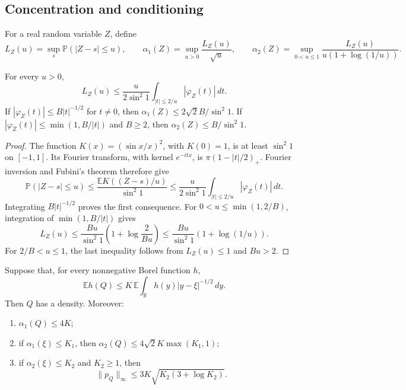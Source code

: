 \subsection{Concentration and conditioning}
For a real random variable $Z$, define
\[
 L_Z(u)=\sup_s\mathbb P(|Z-s|\leq u),\qquad
 \alpha_1(Z)=\sup_{u>0}\frac{L_Z(u)}{\sqrt u},\qquad
 \alpha_2(Z)=\sup_{0<u\leq1}
       \frac{L_Z(u)}{u(1+\log(1/u))}.
\]

\begin{lemma}\label{sd:fejer}
For every $u>0$,
\begin{equation}\label{sd:fejer-bound}
 L_Z(u)\leq\frac{u}{2\sin^2 1}
              \int_{|t|\leq2/u}|\varphi_Z(t)|\,dt.
\end{equation}
If $|\varphi_Z(t)|\leq B|t|^{-1/2}$ for $t\ne0$, then
$\alpha_1(Z)\leq2\sqrt2 B/\sin^2 1$.
If $|\varphi_Z(t)|\leq\min(1,B/|t|)$ and $B\geq2$, then
$\alpha_2(Z)\leq B/\sin^2 1$.
\end{lemma}

\begin{proof}
The function $K(x)=(\sin x/x)^2$, with $K(0)=1$, is at least
$\sin^2 1$ on $[-1,1]$.  Its Fourier transform, with kernel $e^{-itx}$,
is $\pi(1-|t|/2)_+$.  Fourier inversion and Fubini's theorem therefore give
\[
 \mathbb P(|Z-s|\leq u)
 \leq\frac{\mathbb E K((Z-s)/u)}{\sin^2 1}
 \leq\frac{u}{2\sin^2 1}
            \int_{|t|\leq2/u}|\varphi_Z(t)|\,dt.
\]
Integrating $B|t|^{-1/2}$ proves the first consequence.
For $0<u\leq\min(1,2/B)$, integration of $\min(1,B/|t|)$ gives
\[
 L_Z(u)\leq\frac{Bu}{\sin^2 1}
       \left(1+\log\frac{2}{Bu}\right)
 \leq\frac{Bu}{\sin^2 1}(1+\log(1/u)).
\]
For $2/B<u\leq1$, the last inequality follows from $L_Z(u)\leq1$
and $Bu>2$.
\end{proof}

\begin{lemma}\label{sd:composition}
Suppose that, for every nonnegative Borel function $h$,
\begin{equation}\label{sd:profile}
 \mathbb E h(Q)\leq
 K\,\mathbb E\int_{\mathbb R}h(y)|y-\xi|^{-1/2}\,dy.
\end{equation}
Then $Q$ has a density.  Moreover:
\begin{enumerate}
\item $\alpha_1(Q)\leq4K$;
\item if $\alpha_1(\xi)\leq K_1$, then
$\alpha_2(Q)\leq4\sqrt2 K\max(K_1,1)$;
\item if $\alpha_2(\xi)\leq K_2$ and $K_2\geq1$, then
\begin{equation}\label{sd:composition-density}
 \|p_Q\|_\infty\leq3K\sqrt{K_2(3+\log K_2)}.
\end{equation}
\end{enumerate}
\end{lemma}

